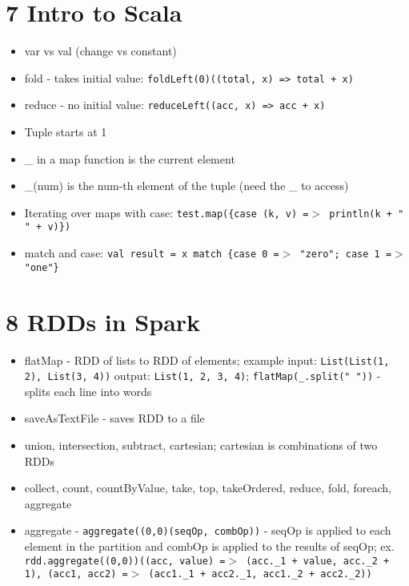 \documentclass[12pt]{article}
\begin{document}
\section*{7 Intro to Scala}
\begin{itemize}
    \item var vs val (change vs constant)
    \item fold - takes initial value: \texttt{foldLeft(0)((total, x) => total + x)}
    \item reduce - no initial value: \texttt{reduceLeft((acc, x) => acc + x)}
    \item Tuple starts at 1
    \item \_ in a map function is the current element
    \item \_(num) is the num-th element of the tuple (need the \_ to access)
    \item Iterating over maps with case: \texttt{test.map(\{case (k, v) =$>$ println(k + " " + v)\})}
    \item match and case: \texttt{val result = x match \{case 0 =$>$ "zero"; case 1 =$>$ "one"\}}
\end{itemize}

\section*{8 RDDs in Spark}
\begin{itemize}
    \item flatMap - RDD of lists to RDD of elements; example input: \texttt{List(List(1, 2), List(3, 4))} output: \texttt{List(1, 2, 3, 4)};
    \texttt{flatMap(\_.split(" "))} - splits each line into words
    \item saveAsTextFile - saves RDD to a file
    \item union, intersection, subtract, cartesian; cartesian is combinations of two RDDs
    \item collect, count, countByValue, take, top, takeOrdered, reduce, fold, foreach, aggregate
    \item aggregate - \texttt{aggregate((0,0)(seqOp, combOp))} - seqOp is applied to each element in the partition and combOp is applied to the results of seqOp;
    ex. \texttt{rdd.aggregate((0,0))((acc, value) =$>$ (acc.\_1 + value, acc.\_2 + 1), (acc1, acc2) =$>$ (acc1.\_1 + acc2.\_1, acc1.\_2 + acc2.\_2))}
\end{itemize}
\end{document}
